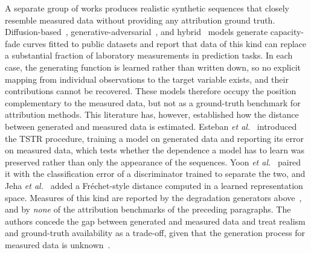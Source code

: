 \documentclass{article}
\begin{document}
A separate group of works produces realistic synthetic sequences that closely resemble measured data without providing any attribution ground truth. Diffusion-based~\cite{diffbatt2024}, generative-adversarial~\cite{naaz2021}, and hybrid~\cite{degradai2025} models generate capacity-fade curves fitted to public datasets and report that data of this kind can replace a substantial fraction of laboratory measurements in prediction tasks. In each case, the generating function is learned rather than written down, so no explicit mapping from individual observations to the target variable exists, and their contributions cannot be recovered. These models therefore occupy the position complementary to the measured data, but not as a ground-truth benchmark for attribution methods.
This literature has, however, established how the distance between generated and measured data is estimated. Esteban \emph{et al.}~\cite{esteban2017} introduced the TSTR procedure, training a model on generated data and reporting its error on measured data, which tests whether the dependence a model has to learn was preserved rather than only the appearance of the sequences. Yoon \emph{et al.}~\cite{yoon2019} paired it with the classification error of a discriminator trained to separate the two, and Jeha \emph{et al.}~\cite{psagan2022} added a Fr\'{e}chet-style distance computed in a learned representation space. Measures of this kind are reported by the degradation generators above~\cite{diffbatt2024}, and by \emph{none} of the attribution benchmarks of the preceding paragraphs. The authors concede the gap between generated and measured data and treat realism and ground-truth availability as a trade-off, given that the generation process for measured data is unknown~\cite{xaibench2021}.
\end{document}
